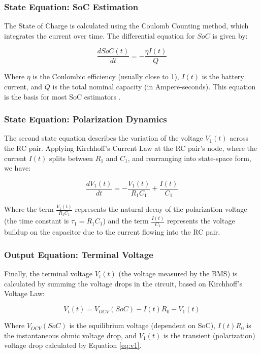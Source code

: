 \documentclass[]{article}
\begin{document}
\subsubsection{State Equation: SoC Estimation}
The State of Charge is calculated using the Coulomb Counting method, which integrates the current over time. The differential equation for $SoC$ is given by:

\begin{equation}
	\label{eq:soc}
	\frac{dSoC(t)}{dt} = - \frac{\eta I(t)}{Q}
\end{equation}

Where $\eta$ is the Coulombic efficiency (usually close to 1), $I(t)$ is the battery current, and $Q$ is the total nominal capacity (in Ampere-seconds). This equation is the basis for most SoC estimators \cite{xie2023state}.

\subsubsection{State Equation: Polarization Dynamics}
The second state equation describes the variation of the voltage $V_1(t)$ across the RC pair. Applying Kirchhoff's Current Law at the RC pair's node, where the current $I(t)$ splits between $R_1$ and $C_1$, and rearranging into state-space form, we have:

\begin{equation}
	\label{eq:v1}
	\frac{dV_1(t)}{dt} = - \frac{V_1(t)}{R_1 C_1} + \frac{I(t)}{C_1}
\end{equation}

Where the term $\frac{V_1(t)}{R_1 C_1}$ represents the natural decay of the polarization voltage (the time constant is $\tau_1 = R_1 C_1$) and the term $\frac{I(t)}{C_1}$ represents the voltage buildup on the capacitor due to the current flowing into the RC pair.

\subsubsection{Output Equation: Terminal Voltage}
Finally, the terminal voltage $V_t(t)$ (the voltage measured by the BMS) is calculated by summing the voltage drops in the circuit, based on Kirchhoff's Voltage Law:

\begin{equation}
	\label{eq:vt}
	V_t(t) = V_{OCV}(SoC) - I(t)R_0 - V_1(t)
\end{equation}

Where $V_{OCV}(SoC)$ is the equilibrium voltage (dependent on SoC), $I(t)R_0$ is the instantaneous ohmic voltage drop, and $V_1(t)$ is the transient (polarization) voltage drop calculated by Equation \ref{eq:v1}.
\end{document}
